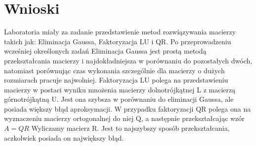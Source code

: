 \documentclass{article}
\begin{document}
\section{Wnioski}
Laboratoria miały za zadanie przedstawienie metod rozwiązywania macierzy takich jak: Eliminacja Gaussa, Faktoryzacja LU i QR.
Po przeprowadzeniu wcześniej określonych zadań 
Eliminacja Gaussa jest prostą metodą przekształcania macierzy i najdokładniejsza w porównaniu do pozostałych dwóch, natomiast porównując czas wykonania szczególnie dla macierzy o dużych rozmiarach pracuje najwolniej.
Faktoryzacja LU polega na przedstawieniu macierzy w postaci wyniku mnożenia macierzy dolnotrójkątnej L z macierzą górnotrójkątną U. Jest ona szybsza w porównaniu do eliminacji Gaussa, ale posiada większy błąd aproksymacji.
W przypadku faktoryzacji QR polega ona na wyznaczeniu macierzy ortogonalnej do niej Q, a następnie przekształcając wzór $ A = QR $ Wyliczamy macierz R. Jest to najszybszy sposób przekształcania, aczkolwiek posiada on największy błąd. 
\end{document}
